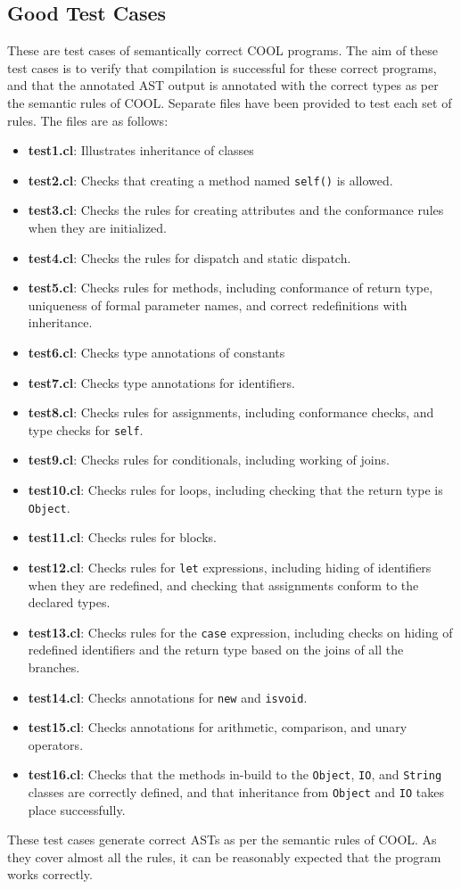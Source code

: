 \documentclass{article}
\begin{document}
\subsection{Good Test Cases}
These are test cases of semantically correct COOL programs. The aim of these test cases is to verify that compilation is successful for these correct programs, and that the annotated AST output is annotated with the correct types as per the semantic rules of COOL. Separate files have been provided to test each set of rules. The files are as follows:
\begin{itemize}
	\item \textbf{test1.cl}: Illustrates inheritance of classes
	\item \textbf{test2.cl}: Checks that creating a method named \verb|self()| is allowed.
	\item \textbf{test3.cl}: Checks the rules for creating attributes and the conformance rules when they are initialized.
	\item \textbf{test4.cl}: Checks the rules for dispatch and static dispatch.
	\item \textbf{test5.cl}: Checks rules for methods, including conformance of return type, uniqueness of formal parameter names, and correct redefinitions with inheritance.
	\item \textbf{test6.cl}: Checks type annotations of constants
	\item \textbf{test7.cl}: Checks type annotations for identifiers.
	\item \textbf{test8.cl}: Checks rules for assignments, including conformance checks, and type checks for \verb|self|.
	\item \textbf{test9.cl}: Checks rules for conditionals, including working of joins.
	\item \textbf{test10.cl}: Checks rules for loops, including checking that the return type is \verb|Object|.
	\item \textbf{test11.cl}: Checks rules for blocks.
	\item \textbf{test12.cl}: Checks rules for \verb|let| expressions, including hiding of identifiers when they are redefined, and checking that assignments conform to the declared types.
	\item \textbf{test13.cl}: Checks rules for the \verb|case| expression, including checks on hiding of redefined identifiers and the return type based on the joins of all the branches.
	\item \textbf{test14.cl}: Checks annotations for \verb|new| and \verb|isvoid|.
	\item \textbf{test15.cl}: Checks annotations for arithmetic, comparison, and unary operators.
	\item \textbf{test16.cl}: Checks that the methods in-build to the \verb|Object|, \verb|IO|, and \verb|String| classes are correctly defined, and that inheritance from \verb|Object| and \verb|IO| takes place successfully.
\end{itemize}
These test cases generate correct ASTs as per the semantic rules of COOL. As they cover almost all the rules, it can be reasonably expected that the program works correctly.
\end{document}

